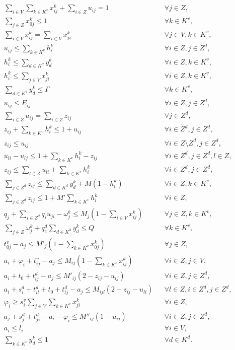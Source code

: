 \documentclass[10pt]{article}
\begin{document}
\[
\begin{aligned}
&\sum_{i \in V} \sum_{k \in K^v} x^k_{ij} + \sum_{i \in Z} u_{ij} = 1 && \forall j \in Z, \\
&\sum_{j \in Z} x^k_{0j} \le 1 && \forall k \in K^v, \\
&\sum_{i \in V} x^k_{ij} = \sum_{i \in V} x^k_{ji} && \forall j \in V, k \in K^v, \\
&u_{ij} \le \sum_{k \in K^v} h^k_i && \forall i \in Z, j \in Z^d, \\
&h^k_i \le \sum_{d \in K^d} y^k_d && \forall i \in Z, k \in K^v, \\
&h^k_i \le \sum_{j \in V} x^k_{ji} && \forall i \in Z, k \in K^v, \\
&\sum_{d \in K^d} y^k_d \le \Gamma && \forall k \in K^v, \\
&u_{ij} \le E_{ij} && \forall i \in Z, j \in Z^d, \\
&\sum_{i \in Z} u_{ij} = \sum_{i \in Z} z_{ij} && \forall j \in Z^d, \\
&z_{ij} + \sum_{k \in K^v} h^k_i \le 1 + u_{ij} && \forall i \in Z^d, j \in Z^d, \\
&z_{ij} \le u_{ij} && \forall i \in Z \setminus Z^d, j \in Z^d, \\
&u_{li} - u_{lj} \le 1 + \sum_{k \in K^v} h^k_i - z_{ij} && \forall i \in Z^d, j \in Z^d, l \in Z, \\
&z_{ij} \le \sum_{l \in Z} u_{li} + \sum_{k \in K^v} h^k_i && \forall i \in Z^d, j \in Z^d, \\
&\sum_{j \in Z^d} z_{ij} \le \sum_{d \in K^d} y^k_d + M(1 - h^k_i) && \forall i \in Z, k \in K^v, \\
&\sum_{j \in Z^d} z_{ij} \le 1 + M' \sum_{k \in K^v} h^k_i && \forall i \in Z, \\
&q_j + \sum_{i \in Z^d} q_i u_{ji} - \omega^k_j \le M_j(1 - \sum_{i \in V} x^k_{ij}) && \forall j \in Z, k \in K^v, \\
&\sum_{j \in Z} \omega^k_j + q^d_1 \sum_{d \in K^d} y^k_d \le Q && \forall k \in K^v, \\
&t^v_{0j} - a_j \le M'_j(1 - \sum_{k \in K^v} x^k_{0j}) && \forall j \in Z, \\
&a_i + \varphi_i + t^v_{ij} - a_j \le M_{ij}(1 - \sum_{k \in K^v} x^k_{ij}) && \forall i \in Z, j \in V, \\
&a_i + t_0 + t^d_{ij} - a_j \le M'_{ij}(2 - z_{ij} - u_{ij}) && \forall i \in Z, j \in Z^d, \\
&a_i + s^d_i + t^d_{il} + t_0 + t^d_{lj} - a_j \le M_{ijl}(2 - z_{ij} - u_{li}) && \forall l \in Z, i \in Z^d, j \in Z^d, \\
&\varphi_i \ge s^v_i \sum_{j \in V} \sum_{k \in K^v} x^k_{ji} && \forall i \in Z, \\
&a_j + s^d_j + t^d_{ji} - a_i - \varphi_i \le M''_{ij}(1 - u_{ij}) && \forall i \in Z, j \in Z^d, \\
&a_i \le l_i && \forall i \in V, \\
&\sum_{k\in K^v}y_d^k\le 1 && \forall d\in K^d.
\end{aligned}
\]
\end{document}
